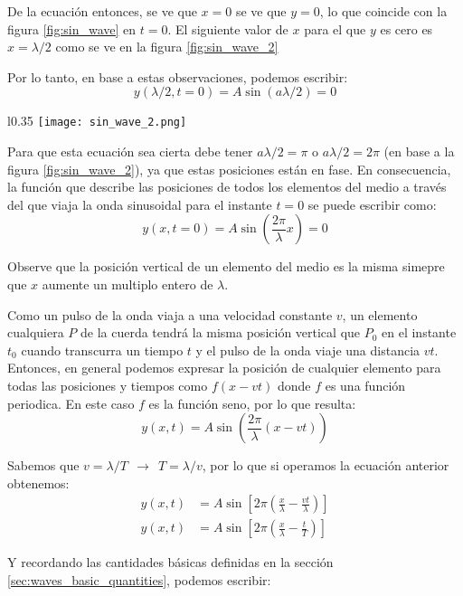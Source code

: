 De la ecuación entonces, se ve que \(x=0\) se ve que \(y=0\), lo que coincide con la figura \ref{fig:sin_wave} en \(t=0\). El siguiente valor de \(x\) para el que \(y\) es cero es \(x=\lambda/2\) como se ve en la figura \ref{fig:sin_wave_2}

Por lo tanto, en base a estas observaciones, podemos escribir:
\[
  y(\lambda/2, t=0) = A \sin(a\lambda/2) = 0
\]
  
\begin{wrapfigure}{l}{0.35\textwidth}
  \centering
  \texttt{[image: sin\_wave\_2.png]}
  \caption{Instantánea de la cuerda en \(t=0\) donde una partícula \(P\) cualquiera tiene la misma posición vertical que \(P_0\) cuando la onda viaja una distancia \(v t\).}
  \label{fig:sin_wave_2}
\end{wrapfigure}
Para que esta ecuación sea cierta debe tener \(a\lambda/2 = \pi\) o \(a\lambda/2 = 2\pi\) (en base a la figura \ref{fig:sin_wave_2}), ya que estas posiciones están en fase. En consecuencia, la función que describe las posiciones de todos los elementos del medio a través del que viaja la onda sinusoidal para el instante \(t=0\) se puede escribir como:
\[
  y(x, t=0) = A \sin(\frac{2\pi}{\lambda} x) = 0
\]

Observe que la posición vertical de un elemento del medio es la misma simepre que \(x\) aumente un multiplo entero de \(\lambda\).

Como un pulso de la onda viaja a una velocidad constante \(v\), un elemento cualquiera \(P\) de la cuerda tendrá la misma posición vertical que \(P_0\) en el instante \(t_0\) cuando transcurra un tiempo \(t\) y el pulso de la onda viaje una distancia \(v t\). Entonces, en general podemos expresar la posición de cualquier elemento para todas las posiciones y tiempos como \(f(x - v t)\) donde \(f\) es una función periodica. En este caso \(f\) es la función seno, por lo que resulta:
\[
  y(x, t) = A \sin\left(\frac{2\pi}{\lambda} (x - v t)\right)
\]
  
Sabemos que \(v = \lambda / T ~~ \rightarrow ~~ T = \lambda/v\), por lo que si operamos la ecuación anterior obtenemos:
\begin{align*}
  y(x, t) & = A \sin\left[2\pi \left(\frac{x}{\lambda} - \frac{vt}{\lambda} \right)\right] \\
  y(x, t) & = A \sin\left[2\pi \left(\frac{x}{\lambda} - \frac{t}{T} \right)\right]
\end{align*}

Y recordando las cantidades básicas definidas en la sección \ref{sec:waves_basic_quantities}, podemos escribir:

